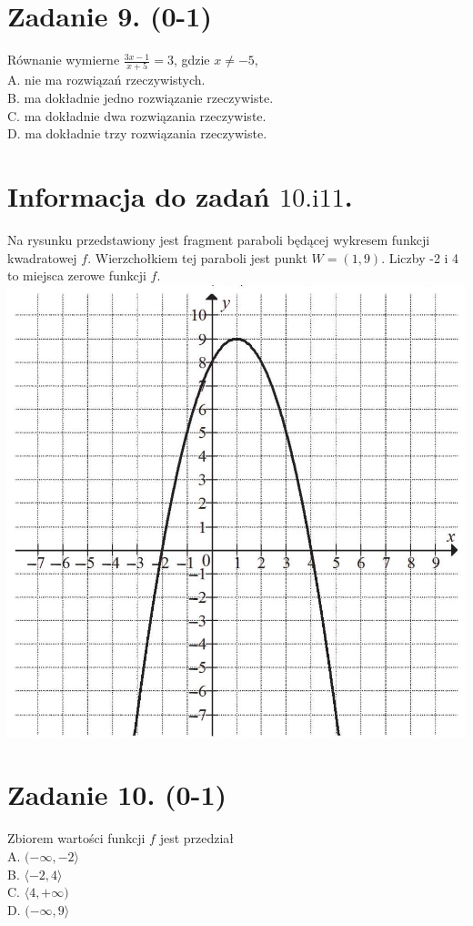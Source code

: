 \documentclass[10pt]{article}
\begin{document}
\section*{Zadanie 9. (0-1)}
Równanie wymierne \(\frac{3 x-1}{x+5}=3\), gdzie \(x \neq-5\),\\
A. nie ma rozwiązań rzeczywistych.\\
B. ma dokładnie jedno rozwiązanie rzeczywiste.\\
C. ma dokładnie dwa rozwiązania rzeczywiste.\\
D. ma dokładnie trzy rozwiązania rzeczywiste.

\section*{Informacja do zadań \(10 . \mathrm{i} 11\).}
Na rysunku przedstawiony jest fragment paraboli będącej wykresem funkcji kwadratowej \(f\). Wierzchołkiem tej paraboli jest punkt \(W=(1,9)\). Liczby -2 i 4 to miejsca zerowe funkcji \(f\).\\
\includegraphics[max width=\textwidth, center]{2024_11_21_1c92fcc0db78c9202015g-04}

\section*{Zadanie 10. (0-1)}
Zbiorem wartości funkcji \(f\) jest przedział\\
A. \((-\infty,-2\rangle\)\\
B. \(\langle-2,4\rangle\)\\
C. \(\langle 4,+\infty)\)\\
D. \((-\infty, 9\rangle\)
\end{document}
